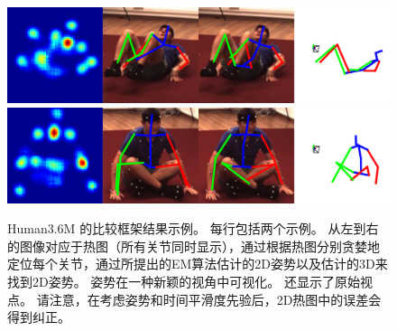 \begin{figure}
\begin{minipage}{0.49\textwidth}
  \includegraphics[width=\linewidth]{figures/examples/h36m/S11-6.pdf}\vspace{0.3em}
  \includegraphics[width=\linewidth]{figures/examples/h36m/S11-7.pdf}\vspace{0.3em}
  \end{minipage}
  \caption{Human3.6M \cite{ionescu2014human}的比较框架结果示例。 每行包括两个示例。 从左到右的图像对应于热图（所有关节同时显示），通过根据热图分别贪婪地定位每个关节，通过所提出的EM算法估计的2D姿势以及估计的3D来找到2D姿势。 姿势在一种新颖的视角中可视化。 还显示了原始视点。 请注意，在考虑姿势和时间平滑度先验后，2D热图中的误差会得到纠正。 }\label{fig:h36m}
\end{figure}

